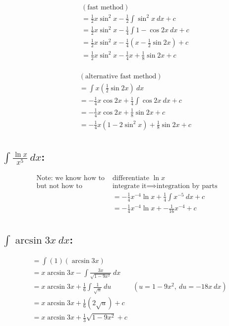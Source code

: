 \documentclass[MathsNotesBase.tex]{subfiles}
\begin{document}
  \begin{align*}
      &&&(\text{fast method})\\
      &&&= \frac{1}{2}x\sin^2{x} - \frac{1}{2}\int{\sin^2{x}\ dx} + c \\[8pt]
      &&&= \frac{1}{2}x\sin^2{x} - \frac{1}{4}\int{1 - \cos{2x}\ dx} + c\\[8pt]
      &&&= \frac{1}{2}x\sin^2{x} - \frac{1}{4}\left(x - \frac{1}{2}\sin{2x}\right) + c \\[8pt]
      &&&= \frac{1}{2}x\sin^2{x} - \frac{1}{4}x + \frac{1}{8}\sin{2x} + c \\[8pt]
  \end{align*}
  
  \begin{align*}
      &&&(\text{alternative fast method})\\
      &&&= \int{x\left(\frac{1}{2}\sin{2x}\right)\ dx} \\[8pt]
      &&&= -\frac{1}{4}x\cos{2x} + \frac{1}{4}\int{\cos{2x}\ dx} + c\\
      &&&= -\frac{1}{4}x\cos{2x} + \frac{1}{8}\sin{2x} + c\\
      &&&= -\frac{1}{4}x(1 - 2\sin^2{x}) + \frac{1}{8}\sin{2x} + c\\
  \end{align*}
  
  
  \subsection*{$\int{\frac{\ln{x}}{x^5}\ dx}$:}
  \begin{align*}
      \text{Note: we know how to }&\text{differentiate }\ln{x}\\
      \text{but not how to }&\text{integrate it}\implies\text{integration by parts} \\
      &= -\frac{1}{4}x^{-4}\ln{x} + \frac{1}{4}\int{x^{-5}\ dx} + c \\[8pt]
      &= -\frac{1}{4}x^{-4}\ln{x} + -\frac{1}{16}x^{-4} + c \\[8pt]
  \end{align*}
  
  \subsection*{$\int{\arcsin{3x}\ dx}$:}
  \begin{align*}
    &= \int{(1)(\arcsin{3x})} \\[8pt]
    &= x\arcsin{3x} - \int{\frac{3x}{\sqrt{1 - 9x^2}}}\ dx \\[8pt]
    &= x\arcsin{3x} + \frac{1}{6}\int{\frac{1}{\sqrt{u}}}\ du &(u = 1 - 9x^2,\ du = -18x\ dx) \\[8pt]
    &= x\arcsin{3x} + \frac{1}{6}(2\sqrt{u}) + c \\[8pt]
    &= x\arcsin{3x} + \frac{1}{3}\sqrt{1 - 9x^2} + c \\[8pt]
  \end{align*}
\end{document}
